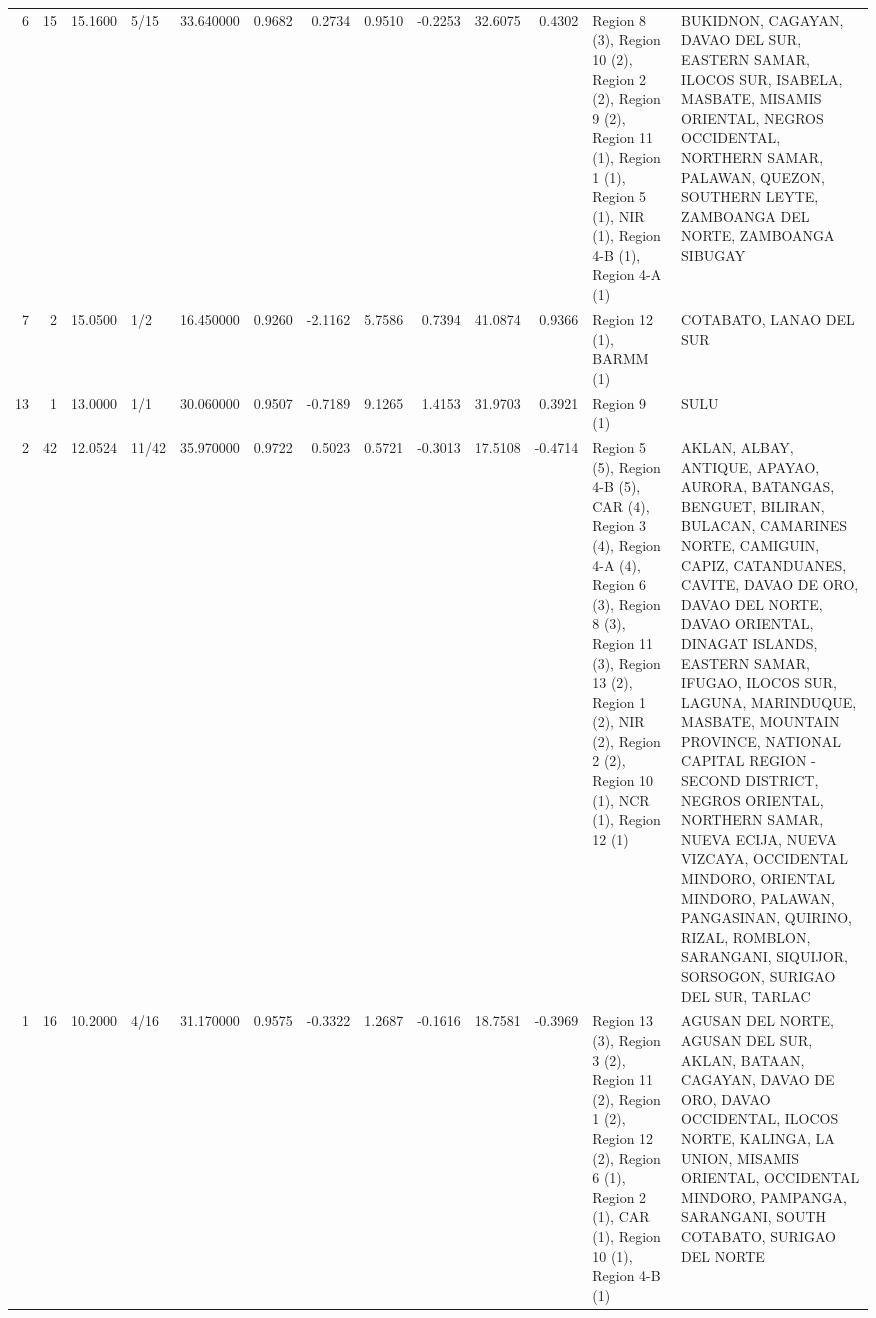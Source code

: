\begin{tabular}{rrrlrrrrrrrll}
6 & 15 & {\cellcolor[HTML]{BAD0F8}} \color[HTML]{000000} 15.1600 & 5/15 & {\cellcolor[HTML]{F7B89C}} \color[HTML]{000000} 33.640000 & 0.9682 & 0.2734 & 0.9510 & -0.2253 & 32.6075 & 0.4302 & Region 8 (3), Region 10 (2), Region 2 (2), Region 9 (2), Region 11 (1), Region 1 (1), Region 5 (1), NIR (1), Region 4-B (1), Region 4-A (1) & BUKIDNON, CAGAYAN, DAVAO DEL SUR, EASTERN SAMAR, ILOCOS SUR, ISABELA, MASBATE, MISAMIS ORIENTAL, NEGROS OCCIDENTAL, NORTHERN SAMAR, PALAWAN, QUEZON, SOUTHERN LEYTE, ZAMBOANGA DEL NORTE, ZAMBOANGA SIBUGAY \\
7 & 2 & {\cellcolor[HTML]{B9D0F9}} \color[HTML]{000000} 15.0500 & 1/2 & {\cellcolor[HTML]{465ECF}} \color[HTML]{F1F1F1} 16.450000 & 0.9260 & -2.1162 & 5.7586 & 0.7394 & 41.0874 & 0.9366 & Region 12 (1), BARMM (1) & COTABATO, LANAO DEL SUR \\
13 & 1 & {\cellcolor[HTML]{A1C0FF}} \color[HTML]{000000} 13.0000 & 1/1 & {\cellcolor[HTML]{E6D7CF}} \color[HTML]{000000} 30.060000 & 0.9507 & -0.7189 & 9.1265 & 1.4153 & 31.9703 & 0.3921 & Region 9 (1) & SULU \\
2 & 42 & {\cellcolor[HTML]{96B7FF}} \color[HTML]{000000} 12.0524 & 11/42 & {\cellcolor[HTML]{F4987A}} \color[HTML]{000000} 35.970000 & 0.9722 & 0.5023 & 0.5721 & -0.3013 & 17.5108 & -0.4714 & Region 5 (5), Region 4-B (5), CAR (4), Region 3 (4), Region 4-A (4), Region 6 (3), Region 8 (3), Region 11 (3), Region 13 (2), Region 1 (2), NIR (2), Region 2 (2), Region 10 (1), NCR (1), Region 12 (1) & AKLAN, ALBAY, ANTIQUE, APAYAO, AURORA, BATANGAS, BENGUET, BILIRAN, BULACAN, CAMARINES NORTE, CAMIGUIN, CAPIZ, CATANDUANES, CAVITE, DAVAO DE ORO, DAVAO DEL NORTE, DAVAO ORIENTAL, DINAGAT ISLANDS, EASTERN SAMAR, IFUGAO, ILOCOS SUR, LAGUNA, MARINDUQUE, MASBATE, MOUNTAIN PROVINCE, NATIONAL CAPITAL REGION - SECOND DISTRICT, NEGROS ORIENTAL, NORTHERN SAMAR, NUEVA ECIJA, NUEVA VIZCAYA, OCCIDENTAL MINDORO, ORIENTAL MINDORO, PALAWAN, PANGASINAN, QUIRINO, RIZAL, ROMBLON, SARANGANI, SIQUIJOR, SORSOGON, SURIGAO DEL SUR, TARLAC \\
1 & 16 & {\cellcolor[HTML]{80A3FA}} \color[HTML]{F1F1F1} 10.2000 & 4/16 & {\cellcolor[HTML]{EED0C0}} \color[HTML]{000000} 31.170000 & 0.9575 & -0.3322 & 1.2687 & -0.1616 & 18.7581 & -0.3969 & Region 13 (3), Region 3 (2), Region 11 (2), Region 1 (2), Region 12 (2), Region 6 (1), Region 2 (1), CAR (1), Region 10 (1), Region 4-B (1) & AGUSAN DEL NORTE, AGUSAN DEL SUR, AKLAN, BATAAN, CAGAYAN, DAVAO DE ORO, DAVAO OCCIDENTAL, ILOCOS NORTE, KALINGA, LA UNION, MISAMIS ORIENTAL, OCCIDENTAL MINDORO, PAMPANGA, SARANGANI, SOUTH COTABATO, SURIGAO DEL NORTE \\

\end{tabular}
